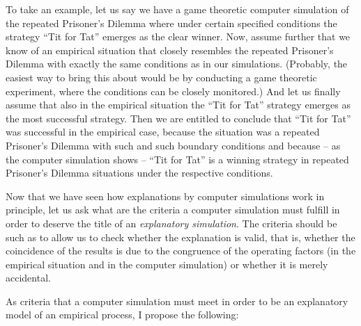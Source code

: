 To take an example, let us say we have a game theoretic computer
simulation of the repeated Prisoner's Dilemma where under certain
specified conditions the strategy ``Tit for Tat'' emerges as the clear
winner. Now, assume further that we know of an empirical situation
that closely resembles the repeated Prisoner's Dilemma with exactly
the same conditions as in our simulations. (Probably, the easiest way
to bring this about would be by conducting a game theoretic
experiment, where the conditions can be closely monitored.) And let us
finally assume that also in the empirical situation the ``Tit for
Tat'' strategy emerges as the most successful strategy. Then we are
entitled to conclude that ``Tit for Tat'' was successful in the
empirical case, because the situation was a repeated Prisoner's
Dilemma with such and such boundary conditions and because -- as the
computer simulation shows -- ``Tit for Tat'' is a winning strategy in
repeated Prisoner's Dilemma situations under the respective
conditions.

Now that we have seen how explanations by computer simulations work in
principle, let us ask what are the criteria a computer simulation must
fulfill in order to deserve the title of an {\em explanatory
simulation}. The criteria should be such as to allow us to check
whether the explanation is valid, that is, whether the coincidence of
the results is due to the congruence of the operating factors (in the
empirical situation and in the computer simulation) or whether it is
merely accidental.

As criteria that a computer simulation must meet in order to be an
explanatory model of an empirical process, I propose the following:


